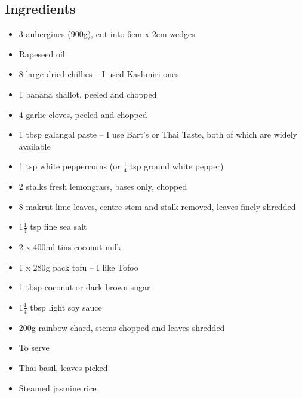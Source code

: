 \documentclass{book}
\begin{document}
\subsection*{Ingredients}
\begin{itemize}
\item 3 aubergines (900g), cut into 6cm x 2cm wedges
\item Rapeseed oil
\item 8 large dried chillies – I used Kashmiri ones
\item 1 banana shallot, peeled and chopped
\item 4 garlic cloves, peeled and chopped
\item 1 tbsp galangal paste – I use Bart’s or Thai Taste, both of which are widely available
\item 1 tsp white peppercorns (or $\frac{1}{4}$ tsp ground white pepper)
\item 2 stalks fresh lemongrass, bases only, chopped
\item 8 makrut lime leaves, centre stem and stalk removed, leaves finely shredded
\item 1$\frac{1}{4}$ tsp fine sea salt
\item 2 x 400ml tins coconut milk
\item 1 x 280g pack tofu – I like Tofoo
\item 1 tbsp coconut or dark brown sugar
\item 1$\frac{1}{4}$ tbsp light soy sauce
\item 200g rainbow chard, stems chopped and leaves shredded
\end{itemize}

\begin{itemize}
\item To serve
\item Thai basil, leaves picked
\item Steamed jasmine rice
\end{itemize}
\end{document}
